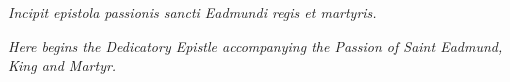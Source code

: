 \documentclass[10pt]{book}
\newcounter{engnote}
\begin{document}
\begin{paracol}{2}

\begin{otherlanguage}{latin}
\begin{center}
\parbox{3cm}{\footnotesize\emph{Incipit epistola passionis sancti Eadmundi regis et martyris.}}
\end{center}

\end{otherlanguage}

\switchcolumn

\begin{center}
\parbox{3cm}{\footnotesize\emph{Here begins the Dedicatory Epistle accompanying the Passion of Saint Eadmund, King and Martyr.}}
\end{center}

\switchcolumn*

\setcounter{engnote}{1}



\end{paracol}
\end{document}
